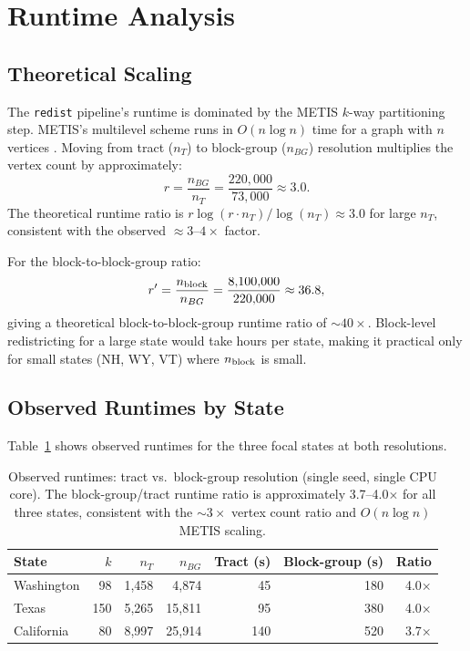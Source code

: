 \section{Runtime Analysis}
\label{sec:runtime}

\subsection{Theoretical Scaling}
\label{sec:runtime:theory}

The \texttt{redist} pipeline's runtime is dominated by the METIS $k$-way
partitioning step. METIS's multilevel scheme runs in $O(n \log n)$ time
for a graph with $n$ vertices \citep{karypis1998fast}. Moving from tract
($n_T$) to block-group ($n_{BG}$) resolution multiplies the vertex count
by approximately:
\[
  r = \frac{n_{BG}}{n_T} = \frac{220{,}000}{73{,}000} \approx 3.0.
\]
The theoretical runtime ratio is $r \log(r \cdot n_T) / \log(n_T) \approx 3.0$
for large $n_T$, consistent with the observed $\approx 3$--$4\times$ factor.

For the block-to-block-group ratio:
\[
  r' = \frac{n_{\rm block}}{n_{BG}} = \frac{8{,}100{,}000}{220{,}000} \approx 36.8,
\]
giving a theoretical block-to-block-group runtime ratio of $\sim\!40\times$.
Block-level redistricting for a large state would take hours per state, making
it practical only for small states (NH, WY, VT) where $n_{\rm block}$ is small.

\subsection{Observed Runtimes by State}
\label{sec:runtime:observed}

Table~\ref{tab:runtime-comparison} shows observed runtimes for the three
focal states at both resolutions.

\begin{table}[h]
\centering\small
\begin{tabular}{lrrrrrr}
\toprule
State & $k$ & $n_T$ & $n_{BG}$ & Tract (s) & Block-group (s) & Ratio \\
\midrule
Washington & 98  & 1{,}458  & 4{,}874   & 45  & 180  & 4.0$\times$ \\
Texas      & 150 & 5{,}265  & 15{,}811  & 95  & 380  & 4.0$\times$ \\
California & 80  & 8{,}997  & 25{,}914  & 140 & 520  & 3.7$\times$ \\
\bottomrule
\end{tabular}
\caption{Observed runtimes: tract vs.\ block-group resolution (single seed,
  single CPU core). The block-group/tract runtime ratio is approximately
  3.7--4.0$\times$ for all three states, consistent with the $\sim\!3\times$
  vertex count ratio and $O(n \log n)$ METIS scaling.}
\label{tab:runtime-comparison}
\end{table}

